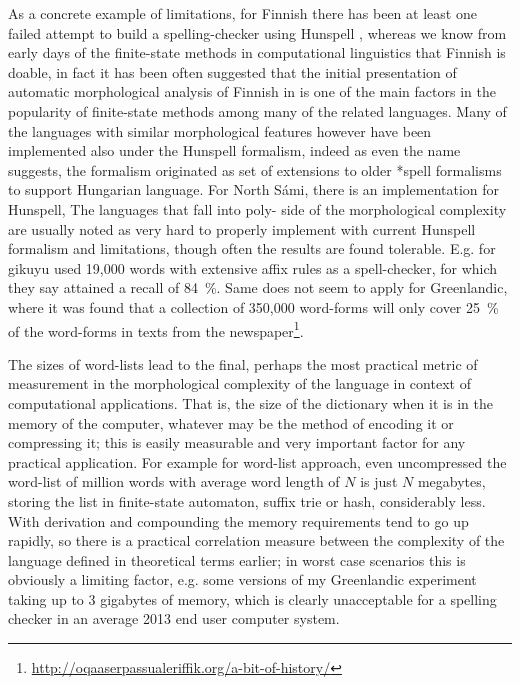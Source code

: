 \documentclass[officiallayout,draft]{unihelcompling}
\begin{document}
As a concrete example of limitations, for Finnish there has been at least one
failed attempt to build a spelling-checker using Hunspell
\citep{pitkanen2006hunspell}, whereas we know from early days of the
finite-state methods in computational linguistics that Finnish is doable, in
fact it has been often suggested that the initial presentation of automatic
morphological analysis of Finnish in \citet{koskenniemi1983twolevel} is one of
the main factors in the popularity of finite-state methods among many of the
related languages. Many of the languages with similar morphological features
however have been implemented also under the Hunspell formalism, indeed as even
the name suggests, the formalism originated as set of extensions to older
*spell formalisms to support Hungarian language. For North Sámi, there is an
implementation for Hunspell, The languages that fall into poly- side of the
morphological complexity are usually noted as very hard to properly implement
with current Hunspell formalism and limitations, though often the results are
found tolerable. E.g. for gikuyu \citet{chege2010developing} used 19,000 words
with extensive affix rules as a spell-checker, for which they say attained a
recall of 84~\%. Same does not seem to apply for Greenlandic, where it was
found that a collection of 350,000 word-forms will only cover 25~\% of the
word-forms in texts from the
newspaper\footnote{\url{http://oqaaserpassualeriffik.org/a-bit-of-history/}}.

The sizes of word-lists lead to the final, perhaps the most practical metric of
measurement in the morphological complexity of the language in context of
computational applications. That is, the size of the dictionary when it is in
the memory of the computer, whatever may be the method of encoding it or
compressing it; this is easily measurable and very important factor for any
practical application.  For example for word-list approach, even uncompressed
the word-list of million words with average word length of $N$ is just $N$
megabytes, storing the list in finite-state automaton, suffix trie or hash,
considerably less. With derivation and compounding the memory requirements tend
to go up rapidly, so there is a practical correlation measure between the
complexity of the language defined in theoretical terms earlier; in worst case
scenarios this is obviously a limiting factor, e.g. some versions of my
Greenlandic experiment taking up to 3 gigabytes of memory, which is clearly
unacceptable for a spelling checker in an average 2013 end user computer
system.
\end{document}
